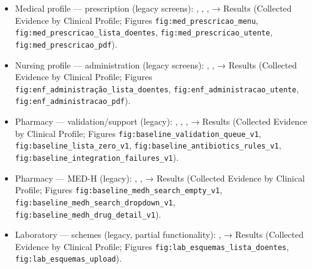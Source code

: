 \begin{itemize}
    \item Medical profile — prescription (legacy screens):
      \texttt{},
      \texttt{},
      \texttt{},
      \texttt{}
      → Results (Collected Evidence by Clinical Profile; Figures \texttt{fig:med\_prescricao\_menu}, \texttt{fig:med\_prescricao\_lista\_doentes}, \texttt{fig:med\_prescricao\_utente}, \texttt{fig:med\_prescricao\_pdf}).
    \item Nursing profile — administration (legacy screens):
      \texttt{},
      \texttt{},
      \texttt{}
      → Results (Collected Evidence by Clinical Profile; Figures \texttt{fig:enf\_administra\c{c}\~ao\_lista\_doentes}, \texttt{fig:enf\_administracao\_utente}, \texttt{fig:enf\_administracao\_pdf}).
    \item Pharmacy — validation/support (legacy):
      \texttt{},
      \texttt{},
      \texttt{},
      \texttt{}
      → Results (Collected Evidence by Clinical Profile; Figures \texttt{fig:baseline\_validation\_queue\_v1}, \texttt{fig:baseline\_lista\_zero\_v1}, \texttt{fig:baseline\_antibiotics\_rules\_v1}, \texttt{fig:baseline\_integration\_failures\_v1}).
    \item Pharmacy — MED-H (legacy):
      \texttt{},
      \texttt{},
      \texttt{}
      → Results (Collected Evidence by Clinical Profile; Figures \texttt{fig:baseline\_medh\_search\_empty\_v1}, \texttt{fig:baseline\_medh\_search\_dropdown\_v1}, \texttt{fig:baseline\_medh\_drug\_detail\_v1}).
    \item Laboratory — schemes (legacy, partial functionality):
      \texttt{},
      \texttt{}
      → Results (Collected Evidence by Clinical Profile; Figures \texttt{fig:lab\_esquemas\_lista\_doentes}, \texttt{fig:lab\_esquemas\_upload}).
\end{itemize}
\endgroup

